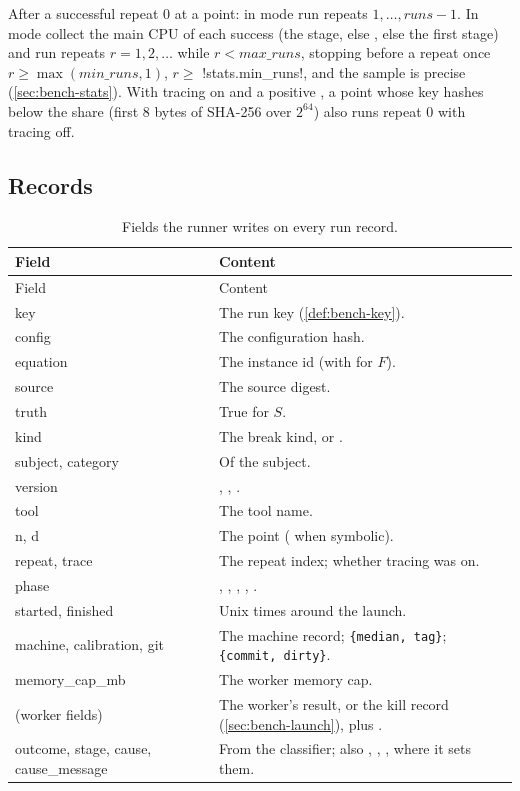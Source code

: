 \begin{algorithm}[Repeats]\label{alg:bench-repeats}
After a successful repeat 0 at a point: in  mode run repeats $1,\dots,\mathit{runs}-1$.
In  mode collect the main CPU of each success (the  stage, else
, else the first stage) and run repeats $r=1,2,\dots$ while $r<\mathit{max\_runs}$,
stopping before a repeat once $r\ge\max(\mathit{min\_runs},1)$, $r\ge$ \py!stats.min_runs!, and
the sample is precise (\cref{sec:bench-stats}). With tracing on and a positive
, a point whose key  hashes below the share (first 8
bytes of SHA-256 over $2^{64}$) also runs repeat 0 with tracing off.
\end{algorithm}

\subsection{Records}

\begin{xltabular}{\textwidth}{@{}>{\ttfamily}p{0.2\textwidth} X@{}}
\caption{Fields the runner writes on every run record.}\label{tab:bench-run-record}\\
\toprule
\normalfont Field & Content\\
\midrule\endfirsthead
\toprule
\normalfont Field & Content\\
\midrule\endhead
\bottomrule\endfoot
key & The run key (\cref{def:bench-key}).\\
config & The configuration hash.\\
equation & The instance id (with \code{!} for $F$).\\
source & The source digest.\\
truth & True for $S$.\\
kind & The break kind, or .\\
subject, category & Of the subject.\\
version & , , .\\
tool & The tool name.\\
n, d & The point ( when symbolic).\\
repeat, trace & The repeat index; whether tracing was on.\\
phase & , , , , .\\
started, finished & Unix times around the launch.\\
machine, calibration, git & The machine record; \texttt{\{median, tag\}}; \texttt{\{commit, dirty\}}.\\
memory\_cap\_mb & The worker memory cap.\\
(worker fields) & The worker's result, or the kill record (\cref{sec:bench-launch}), plus
  .\\
outcome, stage, cause, cause\_message & From the classifier; also ,
  , ,  where it sets them.\\
\end{xltabular}

